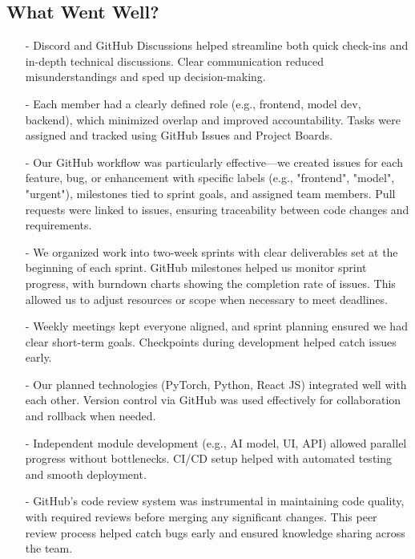 \documentclass{article}
\begin{document}
\subsection{What Went Well?}
\begin{enumerate}
    \item[-] Discord and GitHub Discussions helped streamline both quick check-ins and in-depth technical discussions. Clear communication reduced misunderstandings and sped up decision-making.
    \item[-] Each member had a clearly defined role (e.g., frontend, model dev, backend), which minimized overlap and improved accountability. Tasks were assigned and tracked using GitHub Issues and Project Boards.
    \item[-] Our GitHub workflow was particularly effective—we created issues for each feature, bug, or enhancement with specific labels (e.g., "frontend", "model", "urgent"), milestones tied to sprint goals, and assigned team members. Pull requests were linked to issues, ensuring traceability between code changes and requirements.
    \item[-] We organized work into two-week sprints with clear deliverables set at the beginning of each sprint. GitHub milestones helped us monitor sprint progress, with burndown charts showing the completion rate of issues. This allowed us to adjust resources or scope when necessary to meet deadlines.
    \item[-] Weekly meetings kept everyone aligned, and sprint planning ensured we had clear short-term goals. Checkpoints during development helped catch issues early.
    \item[-] Our planned technologies (PyTorch, Python, React JS) integrated well with each other. Version control via GitHub was used effectively for collaboration and rollback when needed.
    \item[-] Independent module development (e.g., AI model, UI, API) allowed parallel progress without bottlenecks. CI/CD setup helped with automated testing and smooth deployment.
    \item[-] GitHub's code review system was instrumental in maintaining code quality, with required reviews before merging any significant changes. This peer review process helped catch bugs early and ensured knowledge sharing across the team.
\end{enumerate}
\end{document}
